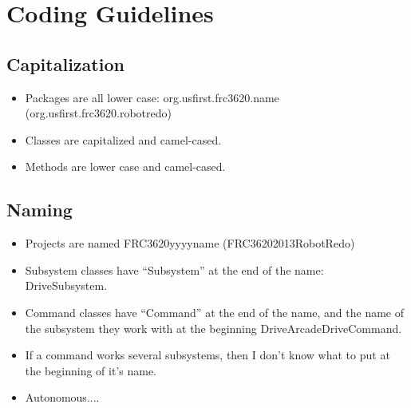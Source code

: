 \documentclass[]{article}
\begin{document}
\newpage

\setcounter{secnumdepth}{4}

\section {Coding Guidelines}

\subsection {Capitalization}

\begin{itemize}
\item Packages are all lower case: org.usfirst.frc3620.name (org.usfirst.frc3620.robotredo)
\item Classes are capitalized and camel-cased.
\item Methods are lower case and camel-cased.
\end{itemize}

\subsection {Naming}

\begin{itemize}
\item Projects are named FRC3620yyyyname (FRC36202013RobotRedo)
\item Subsystem classes have “Subsystem” at the end of the name: DriveSubsystem.
\item Command classes have “Command” at the end of the name, and the name of the subsystem they work with at the beginning DriveArcadeDriveCommand.
\item If a command works several subsystems, then I don't know what to put at the beginning of it's name.
\item Autonomous....
\end{itemize}
\end{document}
